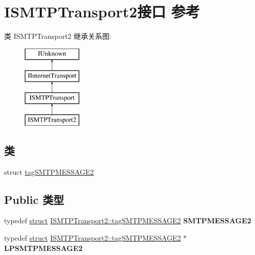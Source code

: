 \hypertarget{class_i_s_m_t_p_transport2}{}\section{I\+S\+M\+T\+P\+Transport2接口 参考}
\label{class_i_s_m_t_p_transport2}
类 I\+S\+M\+T\+P\+Transport2 继承关系图\+:\begin{figure}[H]
\begin{center}
\leavevmode
\includegraphics[height=4.000000cm]{class_i_s_m_t_p_transport2}
\end{center}
\end{figure}
\subsection*{类}
\begin{DoxyCompactItemize}
\item 
struct \hyperlink{struct_i_s_m_t_p_transport2_1_1tag_s_m_t_p_m_e_s_s_a_g_e2}{tag\+S\+M\+T\+P\+M\+E\+S\+S\+A\+G\+E2}
\end{DoxyCompactItemize}
\subsection*{Public 类型}
\begin{DoxyCompactItemize}
\item 
\mbox{\label{class_i_s_m_t_p_transport2_a0d10ac62b6981e4436ba6024caf5bc3a}} 
typedef \hyperlink{interfacestruct}{struct} \hyperlink{struct_i_s_m_t_p_transport2_1_1tag_s_m_t_p_m_e_s_s_a_g_e2}{I\+S\+M\+T\+P\+Transport2\+::tag\+S\+M\+T\+P\+M\+E\+S\+S\+A\+G\+E2} {\bfseries S\+M\+T\+P\+M\+E\+S\+S\+A\+G\+E2}
\item 
\mbox{\label{class_i_s_m_t_p_transport2_ad94de8060552a2b24bc8cd3b85ce949c}} 
typedef \hyperlink{interfacestruct}{struct} \hyperlink{struct_i_s_m_t_p_transport2_1_1tag_s_m_t_p_m_e_s_s_a_g_e2}{I\+S\+M\+T\+P\+Transport2\+::tag\+S\+M\+T\+P\+M\+E\+S\+S\+A\+G\+E2} $\ast$ {\bfseries L\+P\+S\+M\+T\+P\+M\+E\+S\+S\+A\+G\+E2}
\end{DoxyCompactItemize}
